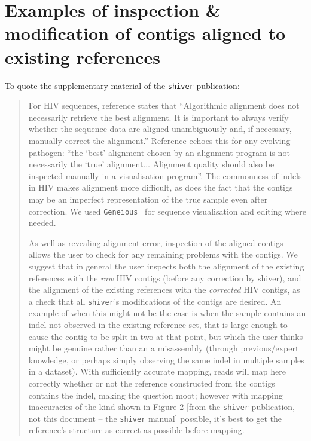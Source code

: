 \documentclass{article}
\newcommand{\shiv}{\c{shiver}\xspace}
\let\c\texttt
\newcommand{\www}{\color{blue} \underline}
\begin{document}
\section{Examples of inspection \& modification of contigs aligned to existing references} \label{sec:ContigAlnExamples}

To quote the supplementary material of the \shiv \href{https://doi.org/10.1093/ve/vey007}{\www{publication}}:

\begin{quotation}
For HIV sequences, reference \cite{AlignmentReview} states that ``Algorithmic alignment does not necessarily retrieve the best alignment.
It is important to always verify whether the sequence data are aligned unambiguously and, if necessary, manually correct the alignment.''
Reference \cite{McElroy2014} echoes this for any evolving pathogen: ``the `best' alignment chosen by an alignment program is not necessarily the `true' alignment$\ldots$ Alignment quality should also be inspected manually in a visualisation program''.
The commonness of indels in HIV makes alignment more difficult, as does the fact that the contigs may be an imperfect representation of the true sample even after correction.
We used \texttt{Geneious}~\cite{Geneious} for sequence visualisation and editing where needed.

As well as revealing alignment error, inspection of the aligned contigs allows the user to check for any remaining 
problems with the contigs.
We suggest that in general the user inspects both the alignment of the existing references with the {\it raw} HIV contigs (before any correction by shiver), and the alignment of the existing references with the {\it corrected} HIV contigs, as a check that all \shiv's modifications of the contigs are desired.
An example of when this might not be the case is when the sample contains an indel not observed in the existing reference set, that is large enough to cause the contig to be split in two at that point, but which the user thinks might be genuine rather than an a misassembly (through previous/expert knowledge, or perhaps simply observing the same indel in multiple samples in a dataset).
With sufficiently accurate mapping, reads will map here correctly whether or not the reference constructed from the contigs contains the indel, making the question moot; however with mapping inaccuracies of the kind shown in Figure 2 [from the \shiv publication, not this document -- the \shiv manual] possible, it's best to get the reference's structure as correct as possible before mapping.
\end{quotation}
\end{document}
